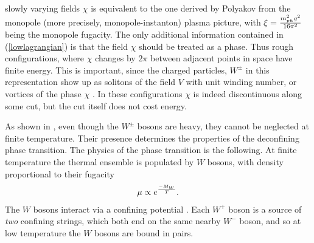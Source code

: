 \documentclass[a4paper,aps,prd,superscriptaddress,showpacs,showkeys]{revtex4}
\begin{document}
slowly varying fields $\chi$ is equivalent to the one derived
by Polyakov \cite{Polyakov} from the monopole (more precisely,
monopole-instanton) plasma picture, with
$\xi= {m_{ph}^2 g^2\over 16\pi^2}$ being the monopole fugacity.
The only additional information contained in (\ref{lowlagrangian}) is
that
the field $\chi$ should be treated as a phase. Thus rough configurations,
where $\chi$ changes by $2\pi$ between adjacent points in space have
finite energy. This is  important, since the charged particles, $W^\pm$
in this  representation show up as solitons of the
field $V$ with unit winding number, or vortices of the phase $\chi$
\cite{kovner}.
In these configurations $\chi$ is indeed discontinuous along
some cut, but the cut itself does not cost energy.

As shown in \cite{gg1}, even though the $W^\pm$ bosons are heavy, they
cannot be neglected at finite temperature. Their presence determines the
properties of the deconfining phase transition. The physics of the phase
transition is the following. At finite temperature the thermal ensemble
is
populated by  $W$ bosons, with density  proportional to their fugacity
\begin{eqnarray}\mu\propto e^{-M_W\over T} .
\label{mu}
\end{eqnarray}The $W$ bosons interact via a confining potential
\cite{Polyakov}.
Each
$W^+$ boson is a source of {\it two} confining strings, which both end on
the same nearby $W^-$ boson, and so at low temperature
the $W$ bosons are bound in pairs.
\end{document}
